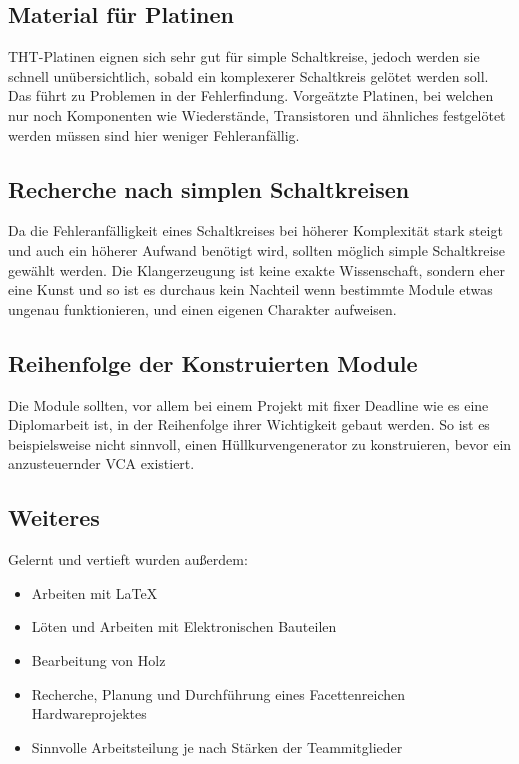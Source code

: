 \subsection{Material für Platinen}
\label{sec:org57c0140}
THT-Platinen eignen sich sehr gut für simple Schaltkreise, jedoch werden sie schnell unübersichtlich, sobald ein komplexerer Schaltkreis gelötet werden soll. Das führt zu Problemen in der Fehlerfindung. Vorgeätzte Platinen, bei welchen nur noch Komponenten wie Wiederstände, Transistoren und ähnliches festgelötet werden müssen sind hier weniger Fehleranfällig.

\subsection{Recherche nach simplen Schaltkreisen}
\label{sec:orgcfb33e9}
Da die Fehleranfälligkeit eines Schaltkreises bei höherer Komplexität stark steigt und auch ein höherer Aufwand benötigt wird, sollten möglich simple Schaltkreise gewählt werden. Die Klangerzeugung ist keine exakte Wissenschaft, sondern eher eine Kunst und so ist es durchaus kein Nachteil wenn bestimmte Module etwas ungenau funktionieren, und einen eigenen Charakter aufweisen.

\subsection{Reihenfolge der Konstruierten Module}
\label{sec:org6e2686e}
Die Module sollten, vor allem bei einem Projekt mit fixer Deadline wie es eine Diplomarbeit ist, in der Reihenfolge ihrer Wichtigkeit gebaut werden. So ist es beispielsweise nicht sinnvoll, einen Hüllkurvengenerator zu konstruieren, bevor ein anzusteuernder \ac{VCA} existiert.

\subsection{Weiteres}
\label{sec:orgf2cfc00}
Gelernt und vertieft wurden außerdem:
\begin{itemize}
\item Arbeiten mit \LaTeX
\item Löten und Arbeiten mit Elektronischen Bauteilen
\item Bearbeitung von Holz
\item Recherche, Planung und Durchführung eines Facettenreichen Hardwareprojektes
\item Sinnvolle Arbeitsteilung je nach Stärken der Teammitglieder
\end{itemize}
